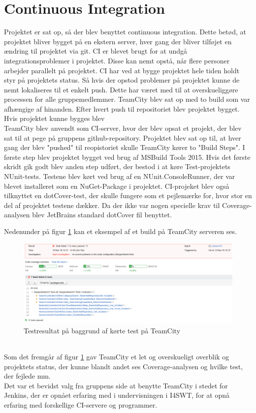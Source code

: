 \section{Continuous Integration}
Projektet er sat op, så der blev benyttet continuous integration. Dette betød, at projektet bliver bygget på en ekstern server, hver gang der bliver tilføjet en ændring til projektet via git. CI er blevet brugt for at undgå integrationsproblemer i projektet. Disse kan nemt opstå, når flere personer arbejder parallelt på projektet. CI har ved at bygge projektet hele tiden holdt styr på projektets status. Så hvis der opstod problemer på projektet kunne de nemt lokaliseres til et enkelt push. Dette har været med til at overskueliggøre processen for alle gruppemedlemmer.
TeamCity blev sat op med to build som var afhængige af hinanden. Efter hvert push til repositoriet blev projektet bygget. Hvis projektet kunne bygges blev 
\\
\noindent TeamCity blev anvendt som CI-server, hvor der blev opsat et  projekt, der blev sat til at pege på gruppens github-repository. Projektet blev sat op til, at hver gang der blev "pushed" til reopistoriet skulle TeamCity kører to "Build Steps". I første step blev projektet bygget ved brug af MSBuild Tools 2015. Hvis det første skridt gik godt blev anden step udført, der bestod i at køre Test-projektets NUnit-tests. Testene blev kørt ved brug af en NUnit.ConsoleRunner, der var blevet installeret som en NuGet-Package i projektet.  
CI-projeket blev også tilknyttet en dotCover-test, der skulle fungere som et pejlemærke for, hvor stor en del af projektet testene dækker. Da der ikke var nogen specielle krav til Coverage-analysen blev JetBrains standard dotCover fil benyttet.

\noindent Nedenunder på figur \ref{fig:TeamCityTest} kan et eksempel af et build på TeamCity serveren ses. 
\begin{figure}[ht!]
	\centering
	\includegraphics[width=120mm]{figures/TeamCityTest.png}
	\caption{Testresultat på baggrund af kørte test på TeamCity}
	\label{fig:TeamCityTest}
\end{figure}
\\
Som det fremgår af figur \ref{fig:TeamCityTest} gav TeamCity et let og overskueligt overblik og projektets status, der kunne blandt andet ses Coverage-analysen og hvilke test, der fejlede mm.
\\
Det var et bevidst valg fra gruppens side at benytte TeamCity i stedet for Jenkins, der er opnået erfaring med i undervisningen i I4SWT, for at opnå erfaring med forskellige CI-servere og programmer.